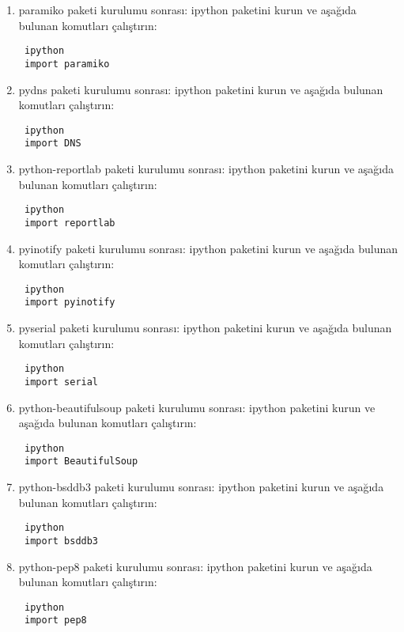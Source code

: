 \documentclass[a4paper,10pt]{article}
\begin{document}
\begin{enumerate}
\item paramiko paketi kurulumu sonrası:
ipython paketini kurun ve aşağıda bulunan komutları çalıştırın:
\begin{verbatim}
 ipython
 import paramiko
\end{verbatim}

\item pydns paketi kurulumu sonrası:
ipython paketini kurun ve aşağıda bulunan komutları çalıştırın:
\begin{verbatim}
 ipython
 import DNS
\end{verbatim}


\item python-reportlab paketi kurulumu sonrası:
ipython paketini kurun ve aşağıda bulunan komutları çalıştırın:
\begin{verbatim}
 ipython
 import reportlab
\end{verbatim}

\item pyinotify paketi kurulumu sonrası:
ipython paketini kurun ve aşağıda bulunan komutları çalıştırın:
\begin{verbatim}
 ipython
 import pyinotify
\end{verbatim}

\item pyserial  paketi kurulumu sonrası:
ipython paketini kurun ve aşağıda bulunan komutları çalıştırın:
\begin{verbatim}
 ipython
 import serial
\end{verbatim}

\item python-beautifulsoup  paketi kurulumu sonrası:
ipython paketini kurun ve aşağıda bulunan komutları çalıştırın:
\begin{verbatim}
 ipython
 import BeautifulSoup
\end{verbatim}

\item python-bsddb3  paketi kurulumu sonrası:
ipython paketini kurun ve aşağıda bulunan komutları çalıştırın:
\begin{verbatim}
 ipython
 import bsddb3
\end{verbatim}

\item python-pep8  paketi kurulumu sonrası:
ipython paketini kurun ve aşağıda bulunan komutları çalıştırın:
\begin{verbatim}
 ipython
 import pep8
\end{verbatim}


\end{enumerate}
\end{document}
